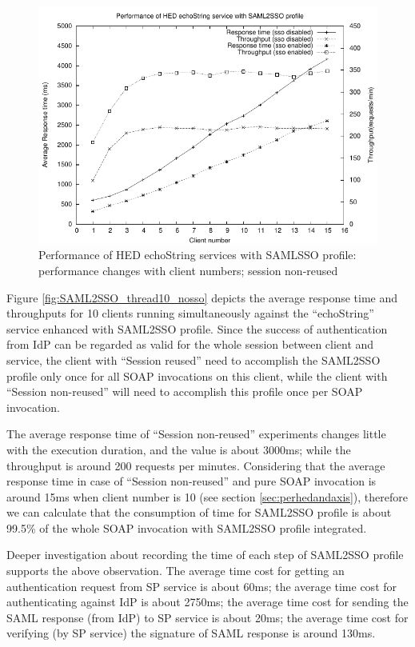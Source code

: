 \documentclass[conference]{IEEEtran}
\begin{document}
\begin{figure}
\includegraphics[width=0.9\columnwidth]{SAML2SSO_thread_all.pdf}
\caption{Performance of HED echoString services with SAMLSSO profile:
performance changes with client numbers; session non-reused }
\label{fig:SAML2SSO_thread_all}
\end{figure}


Figure \ref{fig:SAML2SSO_thread10_nosso} depicts the average response time and
throughputs for 10 clients running simultaneously against the ``echoString'' service enhanced with SAML2SSO
profile. Since the success of authentication from IdP can be regarded as valid for the whole
session between client and service, the client with ``Session reused'' need to accomplish the SAML2SSO
profile only once for all SOAP invocations on this client, while the client with ``Session
non-reused'' will need to accomplish this profile once per SOAP invocation.

The average response time of ``Session non-reused'' experiments changes little
with the execution duration, and the value is about 3000ms; while the throughput is around 200
requests per minutes. Considering that the average response time in case of ``Session non-reused'' and
pure SOAP invocation is around 15ms when client number is 10 (see section \ref{sec:perhedandaxis}),
therefore we can calculate that the consumption of time for SAML2SSO profile is about 99.5\% of
the whole SOAP invocation with SAML2SSO profile integrated. 

Deeper investigation about recording the time of each step of SAML2SSO profile
supports the above observation. The average time cost for getting an authentication request
from SP service is about 60ms; the average time cost for authenticating against IdP is about
2750ms; the average time cost for sending the SAML response (from IdP) to SP service is
about 20ms; the average time cost for verifying (by SP service) the signature of SAML
response is around 130ms.
\end{document}
